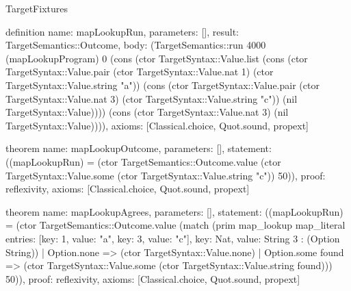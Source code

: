 \begin{lexlean}{TargetFixtures}
\begin{semanticmodule}
definition{
  name: mapLookupRun,
  parameters: [],
  result: TargetSemantics::Outcome,
  body: (TargetSemantics::run 4000 (mapLookupProgram) 0 (cons (ctor TargetSyntax::Value.list (cons (ctor TargetSyntax::Value.pair (ctor TargetSyntax::Value.nat 1) (ctor TargetSyntax::Value.string "a")) (cons (ctor TargetSyntax::Value.pair (ctor TargetSyntax::Value.nat 3) (ctor TargetSyntax::Value.string "c")) (nil TargetSyntax::Value)))) (cons (ctor TargetSyntax::Value.nat 3) (nil TargetSyntax::Value)))),
  axioms: [Classical.choice, Quot.sound, propext]
}

theorem{
  name: mapLookupOutcome,
  parameters: [],
  statement: ((mapLookupRun) = (ctor TargetSemantics::Outcome.value (ctor TargetSyntax::Value.some (ctor TargetSyntax::Value.string "c")) 50)),
  proof: reflexivity{},
  axioms: [Classical.choice, Quot.sound, propext]
}

theorem{
  name: mapLookupAgrees,
  parameters: [],
  statement: ((mapLookupRun) = (ctor TargetSemantics::Outcome.value (match (prim map_lookup map_literal{
      entries: [{key: 1, value: "a"}, {key: 3, value: "c"}],
      key: Nat,
      value: String
    } 3 : (Option String))
    | Option.none => (ctor TargetSyntax::Value.none)
    | Option.some found => (ctor TargetSyntax::Value.some (ctor TargetSyntax::Value.string found))) 50)),
  proof: reflexivity{},
  axioms: [Classical.choice, Quot.sound, propext]
}


\end{semanticmodule}
\end{lexlean}

